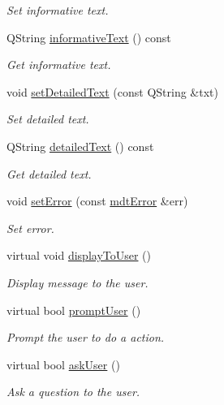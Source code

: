 \begin{DoxyCompactItemize}
\begin{DoxyCompactList}\small\item\em Set informative text. \end{DoxyCompactList}\item 
Q\-String \hyperlink{classmdt_ui_message_handler_a18359aa1b3abffceda5cdc2cf1e05b85}{informative\-Text} () const 
\begin{DoxyCompactList}\small\item\em Get informative text. \end{DoxyCompactList}\item 
void \hyperlink{classmdt_ui_message_handler_ac2f4c7f5e2f0ab800e0b0d051a2e3710}{set\-Detailed\-Text} (const Q\-String \&txt)
\begin{DoxyCompactList}\small\item\em Set detailed text. \end{DoxyCompactList}\item 
Q\-String \hyperlink{classmdt_ui_message_handler_a3730439d46672f52f6868022eca676bf}{detailed\-Text} () const 
\begin{DoxyCompactList}\small\item\em Get detailed text. \end{DoxyCompactList}\item 
void \hyperlink{classmdt_ui_message_handler_a32bf31fb506fb99f04ec9509e58ced83}{set\-Error} (const \hyperlink{classmdt_error}{mdt\-Error} \&err)
\begin{DoxyCompactList}\small\item\em Set error. \end{DoxyCompactList}\item 
virtual void \hyperlink{classmdt_ui_message_handler_abff07a0927096cf14827b28ad08e0d52}{display\-To\-User} ()
\begin{DoxyCompactList}\small\item\em Display message to the user. \end{DoxyCompactList}\item 
virtual bool \hyperlink{classmdt_ui_message_handler_af2c6b70e84fd83b54bb364d44e5a9777}{prompt\-User} ()
\begin{DoxyCompactList}\small\item\em Prompt the user to do a action. \end{DoxyCompactList}\item 
virtual bool \hyperlink{classmdt_ui_message_handler_acbafb01528f77353fe2ecce79aa489d6}{ask\-User} ()
\begin{DoxyCompactList}\small\item\em Ask a question to the user. \end{DoxyCompactList}\end{DoxyCompactItemize}



